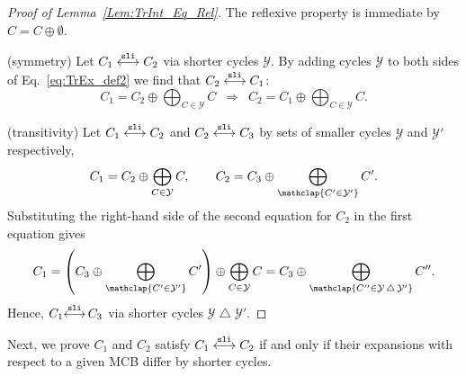 \documentclass[fleqn,11pt]{article}
\newcommand\calY{\mathcal{Y}}
\newcommand\symdiff{\mathop{\triangle}}
\newcommand\slInt{ \stackrel{\tt sli}{\longleftrightarrow} }
\begin{document}
\begin{proof}[Proof of Lemma~\ref{Lem:TrInt_Eq_Rel}]
	The reflexive property is immediate by $C=C\oplus\emptyset$.
	
	(symmetry) Let $C_1\slInt C_2$ via shorter cycles $\calY$. By adding cycles $\calY$ to both sides of Eq.~\eqref{eq:TrEx_def2} we find that $C_2\slInt C_1$:
	\begin{equation*}
		C_1 = C_2\oplus\bigoplus_{C\in\calY} C \enspace\Rightarrow\enspace 
		C_2 = C_1\oplus\bigoplus_{C\in\calY}C.
	\end{equation*}
	
	(transitivity) Let $C_1\slInt C_2$ and $C_2\slInt C_3$ by sets of smaller cycles $\calY$ and $\calY'$ respectively,
	\begin{align*}
		C_1 = C_2\oplus\bigoplus_{C\in\calY}C,\qquad
		C_2 = C_3\oplus\bigoplus_{\mathclap{C'\in\calY'}}C'.
	\end{align*}
	Substituting the right-hand side of the second equation for $C_2$ in the first equation gives
	\begin{equation*}
		C_1 = \left(C_3\oplus\bigoplus_{\mathclap{C'\in\calY'}}C'\right)\oplus\bigoplus_{C\in\calY}C=C_3\oplus\bigoplus_{\mathclap{C''\in\calY\symdiff\calY'}}C''.
	\end{equation*}
	Hence, $C_1{\slInt}\,C_3$ via shorter cycles $\calY\symdiff\calY'$.%
\end{proof}

Next, we prove $C_1$ and $C_2$ satisfy $C_1\slInt C_2$ if and only if their expansions with respect to a given MCB differ by shorter cycles.
\end{document}
